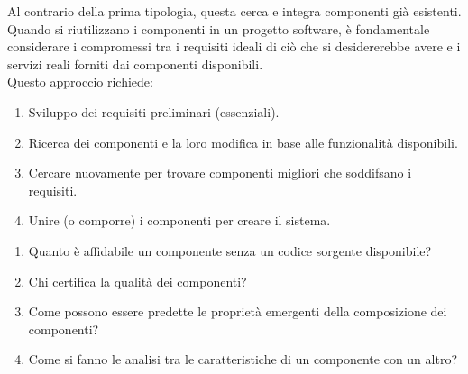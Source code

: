 {    \newpage
    Al contrario della prima tipologia, questa cerca e integra componenti già esistenti.
    Quando si riutilizzano i componenti in un progetto software, è fondamentale considerare i compromessi tra i requisiti ideali 
    di ciò che si desidererebbe avere e i servizi reali forniti dai componenti disponibili.
    \\
    Questo approccio richiede:
    \begin{enumerate}
        \item Sviluppo dei requisiti preliminari (essenziali).
        \item Ricerca dei componenti e la loro modifica in base alle funzionalità disponibili.
        \item Cercare nuovamente per trovare componenti migliori che soddifsano i requisiti.
        \item Unire (o comporre) i componenti per creare il sistema.
    \end{enumerate}

    \begin{enumerate}
        \item Quanto è affidabile un componente senza un codice sorgente disponibile?
        \item Chi certifica la qualità dei componenti?
        \item Come possono essere predette le proprietà emergenti della composizione dei componenti?
        \item Come si fanno le analisi tra le caratteristiche di un componente con un altro?
    \end{enumerate}
}
    \newpage